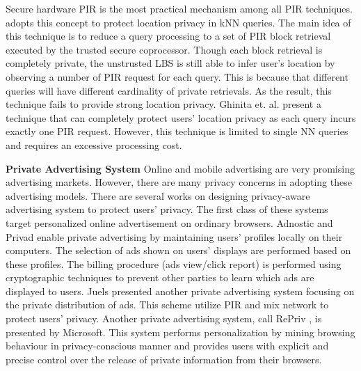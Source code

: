 Secure hardware PIR is the most practical mechanism among all PIR techniques. \cite{Spiral} adopts this concept to protect location privacy in kNN queries. The main idea of this technique is to reduce a query processing to a set of PIR block retrieval executed by the trusted secure coprocessor. Though each block retrieval is completely private, the unstrusted LBS is still able to infer user's location by observing a number of PIR request for each query. This is because that different queries will have different cardinality of private retrievals. As the result, this technique fails to provide strong location privacy. Ghinita et. al. \cite{No_Need_Anonymizer} present a technique that can completely protect users' location privacy as each query incurs exactly one PIR request. However, this technique is limited to single NN queries and requires an excessive processing cost.


\textbf{Private Advertising System} Online and mobile advertising are very promising advertising markets. However, there are many privacy concerns in adopting these advertising models. There are several works on designing privacy-aware advertising system to protect users' privacy. The first class of these systems target personalized online advertisement on ordinary browsers. Adnostic \cite{adnostic} and Privad \cite{Privad} enable private advertising by maintaining users' profiles locally on their computers. The selection of ads shown on users' displays are performed based on these profiles. The billing procedure (ads view/click report) is performed using cryptographic techniques to prevent other parties to learn which ads are displayed to users. Juels \cite{Juels} presented another private advertising system focusing on the private distribution of ads. This scheme utilize PIR and mix network to protect users' privacy. Another private advertising system, call RePriv \cite{REPRIV}, is presented by Microsoft. This system performs personalization by mining browsing behaviour in privacy-conscious manner and provides users with explicit and precise control over the release of private information from their browsers.

